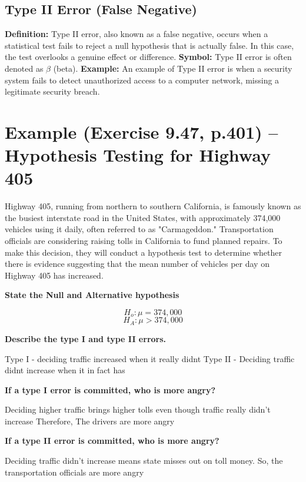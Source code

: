 \documentclass{report}
\begin{document}
\subsection{Type II Error (False Negative)}

\vspace{10pt}
\textbf{Definition:} Type II error, also known as a false negative, occurs when a statistical test fails to reject a null hypothesis that is actually false. In this case, the test overlooks a genuine effect or difference.
\bigbreak \noindent
\textbf{Symbol:} Type II error is often denoted as $\beta$ (beta).
\bigbreak \noindent
\textbf{Example:} An example of Type II error is when a security system fails to detect unauthorized access to a computer network, missing a legitimate security breach.
  \bigbreak \noindent

  \pagebreak
\section*{Example (Exercise 9.47, p.401) – Hypothesis Testing for Highway 405}

Highway 405, running from northern to southern California, is famously known as the busiest interstate road in the United States, with approximately 374,000 vehicles using it daily, often referred to as "Carmageddon." Transportation officials are considering raising tolls in California to fund planned repairs. To make this decision, they will conduct a hypothesis test to determine whether there is evidence suggesting that the mean number of vehicles per day on Highway 405 has increased.
\bigbreak \noindent \bigbreak \noindent
\noindent \begin{large}{\textbf{State the Null and Alternative hypothesis}}\end{large}
\bigbreak \noindent
  $$ H_o : \mu = 374,000$$
  $$ H_A : \mu > 374,000$$
  \bigbreak \noindent
  \begin{large}{\textbf{Describe the type I and type II errors.}}\end{large}
  \bigbreak \noindent
  \begin{center}
  Type I - deciding traffic increased when it really didnt
\bigbreak \noindent
  Type II - Deciding traffic didnt increase when it in fact has
\end{center}
\bigbreak \noindent \bigbreak \noindent
\begin{large}
  \textbf{If a type I error is committed, who is more angry?}
  \end{large}
  \bigbreak \noindent
  \begin{center}
  Deciding higher traffic brings higher tolls even though traffic really didn't increase
  \bigbreak \noindent
  Therefore, The drivers are more angry
\end{center}
\bigbreak \noindent
\begin{large}
  \textbf{If a type II error is committed, who is more angry?}
  \end{large}
  \bigbreak \noindent
  \begin{center}
  Deciding traffic didn't increase means state misses out on toll money. 
\bigbreak \noindent
  So, the transportation officials are more angry
  \end{center}
\end{document}
